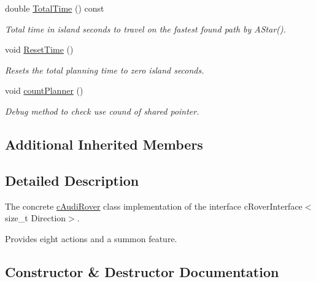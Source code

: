 \begin{DoxyCompactItemize}
\mbox{\label{classplanner_1_1c_audi_rover_a3457f112b5906654ca4dbefef7ea7e46}} 
double \mbox{\hyperlink{classplanner_1_1c_audi_rover_a3457f112b5906654ca4dbefef7ea7e46}{Total\+Time}} () const
\begin{DoxyCompactList}\small\item\em Total time in island seconds to travel on the fastest found path by A\+Star(). \end{DoxyCompactList}\item 
\mbox{\label{classplanner_1_1c_audi_rover_a581d4a30c727d6fbe224b317834a45ba}} 
void \mbox{\hyperlink{classplanner_1_1c_audi_rover_a581d4a30c727d6fbe224b317834a45ba}{Reset\+Time}} ()
\begin{DoxyCompactList}\small\item\em Resets the total planning time to zero island seconds. \end{DoxyCompactList}\item 
\mbox{\label{classplanner_1_1c_audi_rover_ab4ff29dbdcf096e9f3ec0a734ed7b2d3}} 
void \mbox{\hyperlink{classplanner_1_1c_audi_rover_ab4ff29dbdcf096e9f3ec0a734ed7b2d3}{count\+Planner}} ()
\begin{DoxyCompactList}\small\item\em Debug method to check use cound of shared pointer. \end{DoxyCompactList}\end{DoxyCompactItemize}
\subsection*{Additional Inherited Members}


\subsection{Detailed Description}
The concrete \mbox{\hyperlink{classplanner_1_1c_audi_rover}{c\+Audi\+Rover}} class implementation of the interface c\+Rover\+Interface$<$size\+\_\+t Direction$>$. 

Provides eight actions and a summon feature. 

\subsection{Constructor \& Destructor Documentation}
\mbox{\label{classplanner_1_1c_audi_rover_abafb926aca93fb8382284a10bd341986}} 
